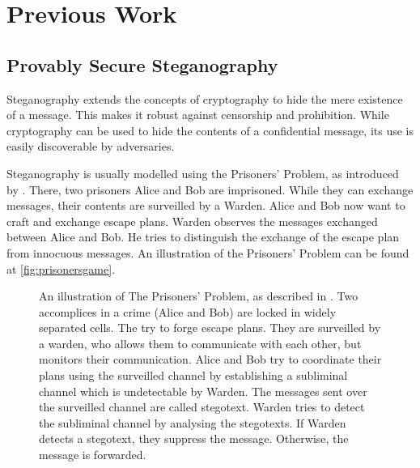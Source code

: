 \chapter{Previous Work}
\label{chap:previous-work}

\section{Provably Secure Steganography}
\label{sec:prov-sec-steg}

Steganography extends the concepts of cryptography to hide the mere existence of a message.
This makes it robust against censorship and prohibition.
While cryptography can be used to hide the contents of a confidential message, its use is easily discoverable by adversaries.


Steganography is usually modelled using the Prisoners' Problem, as introduced by \cite{Simmons1983}.
There, two prisoners Alice and Bob are imprisoned.
While they can exchange messages, their contents are surveilled by a Warden.
Alice and Bob now want to craft and exchange escape plans.
Warden observes the messages exchanged between Alice and Bob.
He tries to distinguish the exchange of the escape plan from innocuous messages.
An illustration of the Prisoners' Problem can be found at \autoref{fig:prisonersgame}.

\begin{figure}[htbp]
\centering
{}
\caption{
An illustration of The Prisoners' Problem, as described in \cite{Simmons1983}.
Two accomplices in a crime (Alice and Bob) are locked in widely separated cells.
The try to forge escape plans.
They are surveilled by a warden, who allows them to communicate with each other, but monitors their communication.
Alice and Bob try to coordinate their plans using the surveilled channel by establishing a subliminal channel which is undetectable by Warden.
The messages sent over the surveilled channel are called stegotext.
Warden tries to detect the subliminal channel by analysing the stegotexts.
If Warden detects a stegotext, they suppress the message.
Otherwise, the message is forwarded.
}
\label{fig:prisonersgame}
\end{figure}

